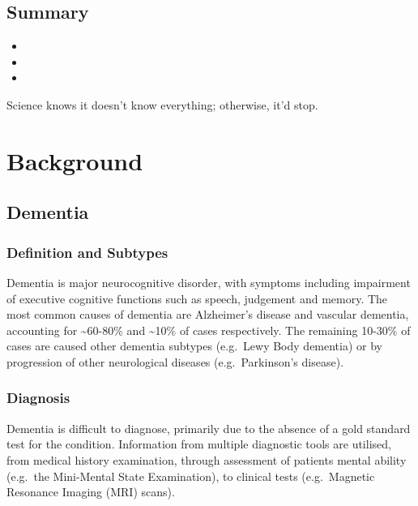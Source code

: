 \documentclass[a4paper, twoside]{templates/ociamthesis}
\begin{document}
\hypertarget{summary}{%
\section{Summary}\label{summary}}

\begin{itemize}
\item
\item
\item
\end{itemize}

\begin{savequote}
Science knows it doesn't know everything; otherwise, it'd stop.
\end{savequote}



\hypertarget{background-heading}{%
\chapter{Background}\label{background-heading}}

\minitoc 

\hypertarget{dementia}{%
\section{Dementia}\label{dementia}}

\hypertarget{definition-and-subtypes}{%
\subsection{Definition and Subtypes}\label{definition-and-subtypes}}

Dementia is major neurocognitive disorder, with symptoms including impairment of executive cognitive functions such as speech, judgement and memory. The most common causes of dementia are Alzheimer's disease and vascular dementia, accounting for \textasciitilde60-80\% and \textasciitilde10\% of cases respectively. The remaining 10-30\% of cases are caused other dementia subtypes (e.g.~Lewy Body dementia) or by progression of other neurological diseases (e.g.~Parkinson's disease).

\hypertarget{diagnosis}{%
\subsection{Diagnosis}\label{diagnosis}}

Dementia is difficult to diagnose, primarily due to the absence of a gold standard test for the condition. Information from multiple diagnostic tools are utilised, from medical history examination, through assessment of patients mental ability (e.g.~the Mini-Mental State Examination), to clinical tests (e.g.~Magnetic Resonance Imaging (MRI) scans).
\end{document}
